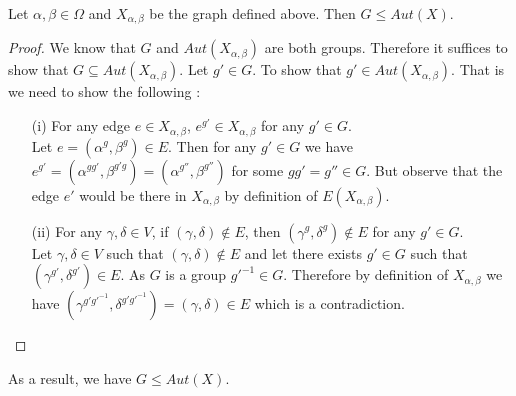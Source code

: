 \begin{lemma}
\label{GsubsetAut}
Let $\alpha,\beta\in \Omega$ and $X_{\alpha,\beta}$ be the graph defined above. Then 
$G\leq Aut(X)$.
\end{lemma}
\begin{proof}
We know that $G$ and $Aut(X_{\alpha,\beta})$ are both groups. Therefore it suffices to show that $G\subseteq Aut(X_{\alpha,\beta})$. Let $g'\in G$. To show that $g'\in Aut(X_{\alpha,\beta})$. That is we need to show the following :
\begin{itemize}
\item[(i)] For any edge $e\in X_{\alpha,\beta}$, $e^{g'}\in X_{\alpha,\beta}$ for any $g'\in G$. \\
Let $e=(\alpha^g,\beta^g)\in E$. Then for any $g'\in G$ we have $e^{g'} = (\alpha^{gg'},\beta^{g'g}) = (\alpha^{g''},\beta^{g''})$ for some $gg'=g''\in G$. But observe that the edge $e'$ would be there in $X_{\alpha,\beta}$ by definition of $E(X_{\alpha,\beta})$.
\item[(ii)] For any $\gamma,\delta\in V$, if $(\gamma,\delta)\not\in E$, then $(\gamma^g,\delta^g)\not\in E$ for any $g'\in G$.\\
Let $\gamma,\delta\in V$ such that $(\gamma,\delta)\not\in E$ and let there exists $g'\in G$ such that $(\gamma^{g'},\delta^{g'})\in E$. As $G$ is a group $g'^{-1}\in G$. Therefore by definition of $X_{\alpha,\beta}$ we have
$(\gamma^{g'g'^{-1}},\delta^{g'g'^{-1}})=(\gamma,\delta)\in E$ which is a contradiction. 
\end{itemize}
\end{proof}
As a result, we have $G\leq Aut(X)$.




